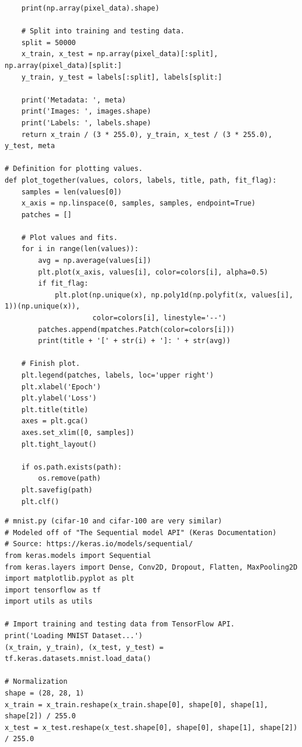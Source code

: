 \documentclass[letterpaper]{article} %
\begin{document}
{\begin{verbatim}
    print(np.array(pixel_data).shape)

    # Split into training and testing data.
    split = 50000
    x_train, x_test = np.array(pixel_data)[:split], np.array(pixel_data)[split:]
    y_train, y_test = labels[:split], labels[split:]

    print('Metadata: ', meta)
    print('Images: ', images.shape)
    print('Labels: ', labels.shape)
    return x_train / (3 * 255.0), y_train, x_test / (3 * 255.0), y_test, meta

# Definition for plotting values.
def plot_together(values, colors, labels, title, path, fit_flag):
    samples = len(values[0])
    x_axis = np.linspace(0, samples, samples, endpoint=True)
    patches = []
    
    # Plot values and fits.
    for i in range(len(values)):
        avg = np.average(values[i])
        plt.plot(x_axis, values[i], color=colors[i], alpha=0.5)
        if fit_flag:
            plt.plot(np.unique(x), np.poly1d(np.polyfit(x, values[i], 1))(np.unique(x)),
                     color=colors[i], linestyle='--')
        patches.append(mpatches.Patch(color=colors[i]))
        print(title + '[' + str(i) + ']: ' + str(avg))
    
    # Finish plot.
    plt.legend(patches, labels, loc='upper right')
    plt.xlabel('Epoch')
    plt.ylabel('Loss')
    plt.title(title)
    axes = plt.gca()
    axes.set_xlim([0, samples])
    plt.tight_layout()
    
    if os.path.exists(path):
        os.remove(path)
    plt.savefig(path)
    plt.clf()
\end{verbatim}

\bigskip

\begin{verbatim}
# mnist.py (cifar-10 and cifar-100 are very similar)
# Modeled off of "The Sequential model API" (Keras Documentation)
# Source: https://keras.io/models/sequential/
from keras.models import Sequential
from keras.layers import Dense, Conv2D, Dropout, Flatten, MaxPooling2D
import matplotlib.pyplot as plt
import tensorflow as tf
import utils as utils

# Import training and testing data from TensorFlow API.
print('Loading MNIST Dataset...')
(x_train, y_train), (x_test, y_test) = tf.keras.datasets.mnist.load_data()

# Normalization
shape = (28, 28, 1)
x_train = x_train.reshape(x_train.shape[0], shape[0], shape[1], shape[2]) / 255.0
x_test = x_test.reshape(x_test.shape[0], shape[0], shape[1], shape[2]) / 255.0


\end{verbatim}}
\end{document}
